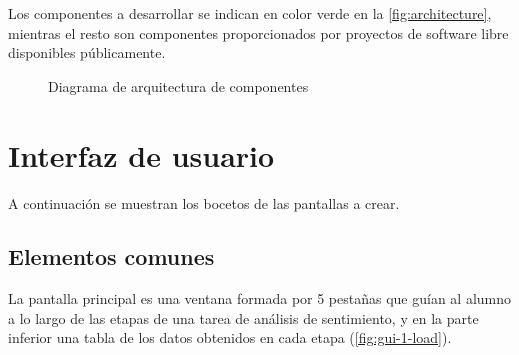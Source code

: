 Los componentes a desarrollar se indican en color verde en la \autoref{fig:architecture}, mientras el resto son componentes proporcionados por proyectos de software libre disponibles públicamente.

\begin{figure}[htbp]
\centering
\vspace{0.5cm}
\resizebox{0.75\textwidth}{!}{}
\caption{Diagrama de arquitectura de componentes}
\label{fig:architecture}
\end{figure}

\section{Interfaz de usuario}

A continuación se muestran los bocetos de las pantallas a crear.

\subsection{Elementos comunes}

La pantalla principal es una ventana formada por 5 pestañas que guían al alumno a lo largo de las etapas de una tarea de análisis de sentimiento, y en la parte inferior una tabla de los datos obtenidos en cada etapa (\autoref{fig:gui-1-load}).

